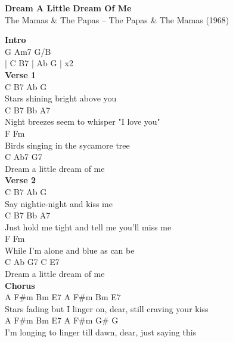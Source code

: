 \documentclass[a4paper]{article}
\begin{document}
    \begin{center}
        \textbf{Dream A Little Dream Of Me}
        ~\\
        The Mamas \& The Papas -- The Papas \& The Mamas (1968)
    \end{center}
    {
        \scriptsize
        \textbf{Intro}
        ~\\
        {
            \cutive
            \obeyspaces
G Am7 G/B
\\
| C   B7  | Ab  G   | x2
\\

        }
        \textbf{Verse 1}
        ~\\
        {
            \cutive
            \obeyspaces
C       B7              Ab    G
\\
  Stars shining bright above you
\\
C       B7      Bb      A7
\\
  Night breezes seem to whisper "I love you"
\\
F                      Fm
\\
  Birds singing in the sycamore tree
\\
C              Ab7       G7
\\
Dream a little dream of me
\\

        }
        \textbf{Verse 2}
        ~\\
        {
            \cutive
            \obeyspaces
C     B7               Ab     G
\\
  Say nightie-night and kiss me
\\
C      B7      Bb        A7
\\
  Just hold me tight and tell me you'll miss me
\\
F                     Fm
\\
  While I'm alone and blue as can be
\\
C              Ab    G7 C   E7
\\
Dream a little dream of me
\\

        }
        \textbf{Chorus}
        ~\\
        {
            \cutive
            \obeyspaces
A       F\#m        Bm       E7      A       F\#m         Bm  E7
\\
  Stars fading but I linger on, dear, still craving your kiss
\\
A     F\#m        Bm           E7       A      F\#m    G\# G
\\
  I'm longing to linger till dawn, dear, just saying this
\\

}}
\end{document}
